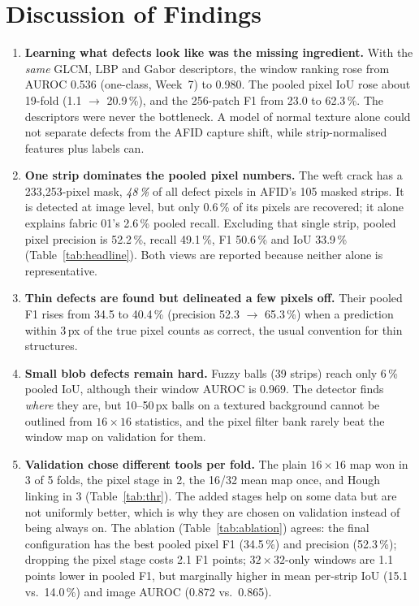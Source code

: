 \documentclass[11pt,a4paper]{article}
\newcommand{\code}[1]{\texttt{\detokenize{#1}}}
\begin{document}
\section*{Discussion of Findings}
\begin{enumerate}
  \item \textbf{Learning what defects look like was the missing ingredient.} With the \emph{same} GLCM, LBP and Gabor descriptors, the window ranking rose from AUROC 0.536 (one-class, Week~7) to 0.980. The pooled pixel IoU rose about 19-fold (1.1 $\rightarrow$ 20.9\,\%), and the 256-patch F1 from 23.0 to 62.3\,\%. The descriptors were never the bottleneck. A model of normal texture alone could not separate defects from the AFID capture shift, while strip-normalised features plus labels can.
  \item \textbf{One strip dominates the pooled pixel numbers.} The weft crack \code{0080_036_01} has a 233{,}253-pixel mask, \emph{48\,\%} of all defect pixels in AFID's 105 masked strips. It is detected at image level, but only 0.6\,\% of its pixels are recovered; it alone explains fabric 01's 2.6\,\% pooled recall. Excluding that single strip, pooled pixel precision is 52.2\,\%, recall 49.1\,\%, F1 50.6\,\% and IoU 33.9\,\% (Table~\ref{tab:headline}). Both views are reported because neither alone is representative.
  \item \textbf{Thin defects are found but delineated a few pixels off.} Their pooled F1 rises from 34.5 to 40.4\,\% (precision 52.3 $\rightarrow$ 65.3\,\%) when a prediction within 3\,px of the true pixel counts as correct, the usual convention for thin structures.
  \item \textbf{Small blob defects remain hard.} Fuzzy balls (39 strips) reach only 6\,\% pooled IoU, although their window AUROC is 0.969. The detector finds \emph{where} they are, but 10--50\,px balls on a textured background cannot be outlined from $16\times16$ statistics, and the pixel filter bank rarely beat the window map on validation for them.
  \item \textbf{Validation chose different tools per fold.} The plain $16\times16$ map won in 3 of 5 folds, the pixel stage in 2, the 16/32 mean map once, and Hough linking in 3 (Table~\ref{tab:thr}). The added stages help on some data but are not uniformly better, which is why they are chosen on validation instead of being always on. The ablation (Table~\ref{tab:ablation}) agrees: the final configuration has the best pooled pixel F1 (34.5\,\%) and precision (52.3\,\%); dropping the pixel stage costs 2.1 F1 points; $32\times32$-only windows are 1.1 points lower in pooled F1, but marginally higher in mean per-strip IoU (15.1 vs.\ 14.0\,\%) and image AUROC (0.872 vs.\ 0.865).

\end{enumerate}
\end{document}
